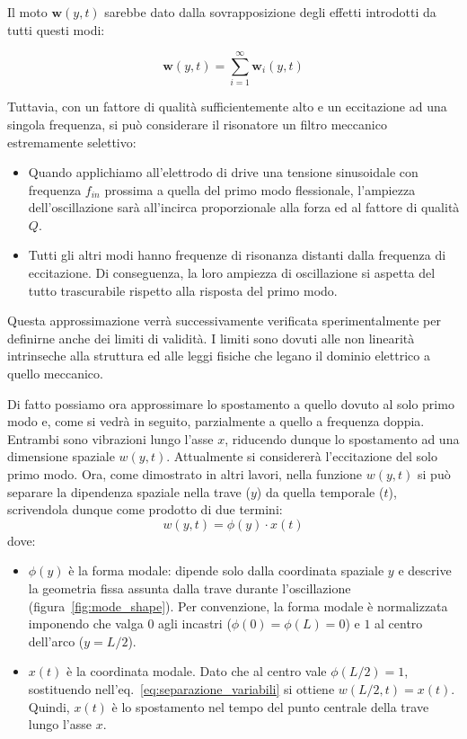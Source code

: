 \documentclass[11pt,a4paper]{article}
\begin{document}
\newpage

\noindent Il moto $\mathbf{w}(y, t)$ sarebbe dato dalla sovrapposizione degli effetti introdotti da tutti questi modi:

\[\mathbf{w}(y, t) = \sum_{i=1}^{\infty} \mathbf{w}_i(y, t)\]

\noindent Tuttavia, con un fattore di qualità sufficientemente alto e un eccitazione ad una singola frequenza, si può considerare il risonatore un filtro meccanico estremamente selettivo:
\begin{itemize}
    \item Quando applichiamo all'elettrodo di drive una tensione sinusoidale con frequenza $f_{in}$ prossima a quella del primo modo flessionale, l'ampiezza dell'oscillazione sarà all'incirca proporzionale alla forza ed al fattore di qualità $Q$.
    \item Tutti gli altri modi hanno frequenze di risonanza distanti dalla frequenza di eccitazione. Di conseguenza, la loro ampiezza di oscillazione si aspetta del tutto trascurabile rispetto alla risposta del primo modo.
\end{itemize}

\noindent Questa approssimazione verrà successivamente verificata sperimentalmente per definirne anche dei limiti di validità. I limiti sono dovuti alle non linearità intrinseche alla struttura ed alle leggi fisiche che legano il dominio elettrico a quello meccanico. 

\noindent Di fatto possiamo ora approssimare lo spostamento a quello dovuto al solo primo modo e, come si vedrà in seguito, parzialmente a quello a frequenza doppia. Entrambi sono vibrazioni lungo l'asse $x$, riducendo dunque lo spostamento ad una dimensione spaziale $w(y, t)$. Attualmente si considererà l'eccitazione del solo primo modo.
\noindent Ora, come dimostrato in altri lavori\cite{frangi2023}, nella funzione $w(y, t)$ si può separare la dipendenza spaziale nella trave ($y$) da quella temporale ($t$), scrivendola dunque come prodotto di due termini:
\begin{equation}
    \label{eq:separazione_variabili}
    w(y, t) = \phi(y) \cdot x(t)
\end{equation}
dove:
\begin{itemize}
    \item $\phi(y)$ è la forma modale: dipende solo dalla coordinata spaziale $y$ e descrive la geometria fissa assunta dalla trave durante l'oscillazione (figura~\ref{fig:mode_shape}). Per convenzione, la forma modale è normalizzata imponendo che valga $0$ agli incastri ($\phi(0) = \phi(L) = 0$) e $1$ al centro dell'arco ($y = L/2$).
    
    \item $x(t)$ è la coordinata modale. Dato che al centro vale $\phi(L/2) = 1$, sostituendo nell'eq.~\eqref{eq:separazione_variabili} si ottiene $w(L/2, t) = x(t)$. Quindi, $x(t)$ è lo spostamento nel tempo del punto centrale della trave lungo l'asse $x$.
\end{itemize}
\end{document}

